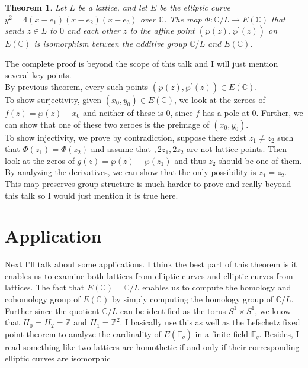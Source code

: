 \documentclass[psamsfonts]{amsart}
\newtheorem{theorem}{Theorem}[section]
\theoremstyle{definition}
\theoremstyle{remark}
\numberwithin{equation}{section}
\begin{document}
		\begin{theorem} 
			Let $L$ be a lattice, and let $E$ be the elliptic curve $y^2 = 4(x-e_1)(x-e_2)(x-e_3)$ over $\mathbb{C}$. The map $\Phi: \mathbb{C}/L \to E(\mathbb{C})$ that sends $z\in L$ to $0$ and each other $z$ to the affine point $(\wp(z),\wp^\prime(z))$ on $E(\mathbb{C})$ is isomorphism between the additive group $\mathbb{C}/L$ and $E(\mathbb{C})$.
		\end{theorem}
		The complete proof is beyond the scope of this talk and I will just mention several key points.\\
		By previous theorem, every such points $(\wp(z),\wp^\prime(z)) \in E(\mathbb{C})$. \\
		To show surjectivity, given $(x_0,y_0) \in E(\mathbb{C})$, we look at the zeroes of $f(z) = \wp(z) - x_0$ and neither of these is $0$, since $f$ has a pole at $0$. Further, we can show that one of these two zeroes is the preimage of $(x_0,y_0)$.\\
		To show injectivity, we prove by contradiction, suppose there exist $z_1 \neq z_2$ such that $\Phi(z_1) = \Phi(z_2)$ and assume that $,2z_1,2z_2$ are not lattice points. Then look at the zeros of $g(z) = \wp(z) - \wp(z_1)$ and thus $z_2$ should be one of them. By analyzing the derivatives, we can show that the only possibility is $z_1 = z_2$.\\
		This map preserves group structure is much harder to prove and really beyond this talk so I would just mention it is true here.
		
		\section{Application}
			Next I'll talk about some applications. I think the best part of this theorem is it enables us to examine both lattices from elliptic curves and elliptic curves from lattices. The fact that $E(\mathbb{C}) = \mathbb{C} / L$ enables us to compute the homology and cohomology group of $E(\mathbb{C})$ by simply computing the homology group of $\mathbb{C} / L$. Further since the quotient $\mathbb{C}/L$ can be identified as the torus $S^1 \times S^1$, we know that $H_0 = H_2 = \mathbb{Z}$ and $H_1 = \mathbb{Z}^2$. I basically use this as well as the Lefschetz fixed point theorem to analyze the cardinality of $E(\mathbb{F}_q)$ in a finite field $\mathbb{F}_q$. Besides, I read something like two lattices are homothetic if and only if their corresponding elliptic curves are isomorphic
\end{document}
